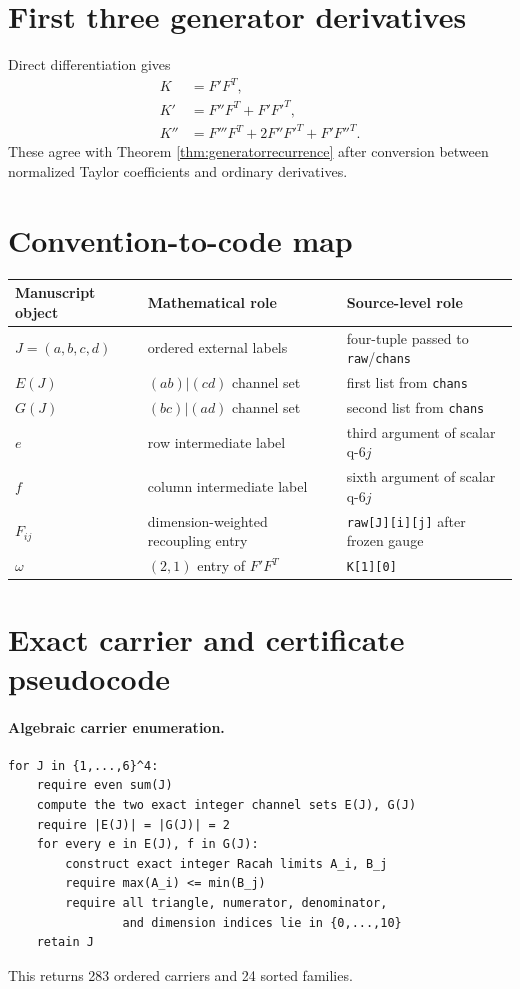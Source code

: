 \appendix
\section{First three generator derivatives}
Direct differentiation gives
\begin{align}
K&=F'F^T,\\
K'&=F''F^T+F'F'^T,\\
K''&=F'''F^T+2F''F'^T+F'F''^T.
\end{align}
These agree with Theorem \ref{thm:generatorrecurrence} after conversion between normalized Taylor coefficients and ordinary derivatives.

\section{Convention-to-code map}
\begin{center}
\begin{tabular}{>{\raggedright\arraybackslash}p{}>{\raggedright\arraybackslash}p{}>{\raggedright\arraybackslash}p{}}
\toprule
Manuscript object & Mathematical role & Source-level role\\
\midrule
$J=(a,b,c,d)$ & ordered external labels & four-tuple passed to \texttt{raw}/\texttt{chans}\\
$E(J)$ & $(ab)|(cd)$ channel set & first list from \texttt{chans}\\
$G(J)$ & $(bc)|(ad)$ channel set & second list from \texttt{chans}\\
$e$ & row intermediate label & third argument of scalar q-$6j$\\
$f$ & column intermediate label & sixth argument of scalar q-$6j$\\
$F_{ij}$ & dimension-weighted recoupling entry & \texttt{raw[J][i][j]} after frozen gauge\\
$\omega$ & $(2,1)$ entry of $F'F^T$ & \texttt{K[1][0]}\\
\bottomrule
\end{tabular}
\end{center}

\section{Exact carrier and certificate pseudocode}
\label{app:pseudocode}
\paragraph{Algebraic carrier enumeration.}
\begin{verbatim}
for J in {1,...,6}^4:
    require even sum(J)
    compute the two exact integer channel sets E(J), G(J)
    require |E(J)| = |G(J)| = 2
    for every e in E(J), f in G(J):
        construct exact integer Racah limits A_i, B_j
        require max(A_i) <= min(B_j)
        require all triangle, numerator, denominator,
                and dimension indices lie in {0,...,10}
    retain J
\end{verbatim}
This returns 283 ordered carriers and 24 sorted families.

